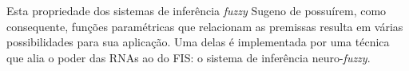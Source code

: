Esta propriedade dos sistemas de inferência \textit{fuzzy} Sugeno de possuírem, como consequente, funções paramétricas que relacionam as premissas resulta em várias possibilidades para sua aplicação. Uma delas é implementada por uma técnica que alia o poder das RNAs ao do FIS: o sistema de inferência neuro-\textit{fuzzy}.
